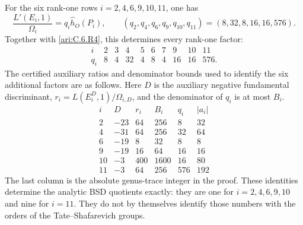 \begin{proposition}\hypertarget{tag-0014}{}\label{ari:C.6.R5}

For the six rank-one rows $i=2,4,6,9,10,11$, one has
\[
 \frac{L'(E_i,1)}{\Omega_i}
   =q_i\widehat h_O(P_i),\qquad
 (q_2,q_4,q_6,q_9,q_{10},q_{11})=(8,32,8,16,16,576).
\]
Together with \ref{ari:C.6.R4}, this determines every rank-one factor:
\[
\begin{array}{c|rrrrrrrrr}
 i&2&3&4&5&6&7&9&10&11\\\hline
 q_i&8&4&32&4&8&4&16&16&576.
\end{array}
\]
The certified auxiliary ratios and denominator bounds used to identify
the six additional factors are as follows. Here $D$ is the auxiliary
negative fundamental discriminant,
$r_i=L(E_i^D,1)/\Omega_{i,D}$, and the denominator of $q_i$ is at most
$B_i$.
\[
\begin{array}{c|r|r|r|r|r}
 i&D&r_i&B_i&q_i&|a_i|\\\hline
 2&-23&64&256&8&32\\
 4&-31&64&256&32&64\\
 6&-19&8&32&8&8\\
 9&-19&16&64&16&16\\
 10&-3&400&1600&16&80\\
 11&-3&64&256&576&192
\end{array}
\]
The last column is the absolute genus-trace integer in the proof. These
identities determine the analytic BSD quotients exactly: they are one
for $i=2,4,6,9,10$ and nine for $i=11$. They do not by themselves
identify those numbers with the orders of the Tate--Shafarevich groups.
\end{proposition}



